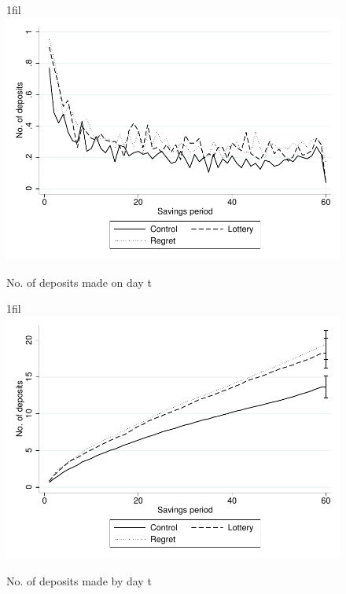 \documentclass[10pt]{article}
\makeatletter
\newcommand*{\centerfloat}{%
  \parindent \z@
  \leftskip \z@ \@plus 1fil \@minus \textwidth
  \rightskip\leftskip
  \parfillskip \z@skip}
\makeatother
\begin{document}
		\begin{figure}[!htb]
		\centering
		\caption{No. of deposits made on day t}
		\centerfloat
		\includegraphics{../../figures/line-deposits.pdf}
		\end{figure}

		\begin{figure}[!htb]
		\centering
		\caption{No. of deposits made by day t}
		\centerfloat
		\includegraphics{../../figures/line-cumdeposits.pdf}
		\end{figure}
\end{document}

